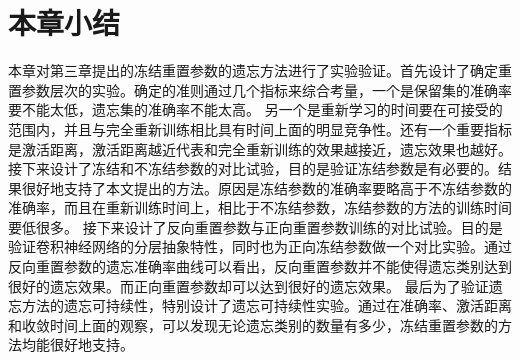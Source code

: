 \section{本章小结}
本章对第三章提出的冻结重置参数的遗忘方法进行了实验验证。首先设计了确定重置参数层次的实验。确定的准则通过几个指标来综合考量，一个是保留集的准确率要不能太低，遗忘集的准确率不能太高。
另一个是重新学习的时间要在可接受的范围内，并且与完全重新训练相比具有时间上面的明显竞争性。还有一个重要指标是激活距离，激活距离越近代表和完全重新训练的效果越接近，遗忘效果也越好。
接下来设计了冻结和不冻结参数的对比试验，目的是验证冻结参数是有必要的。结果很好地支持了本文提出的方法。原因是冻结参数的准确率要略高于不冻结参数的准确率，而且在重新训练时间上，相比于不冻结参数，冻结参数的方法的训练时间要低很多。
接下来设计了反向重置参数与正向重置参数训练的对比试验。目的是验证卷积神经网络的分层抽象特性，同时也为正向冻结参数做一个对比实验。通过反向重置参数的遗忘准确率曲线可以看出，反向重置参数并不能使得遗忘类别达到很好的遗忘效果。而正向重置参数却可以达到很好的遗忘效果。
最后为了验证遗忘方法的遗忘可持续性，特别设计了遗忘可持续性实验。通过在准确率、激活距离和收敛时间上面的观察，可以发现无论遗忘类别的数量有多少，冻结重置参数的方法均能很好地支持。

